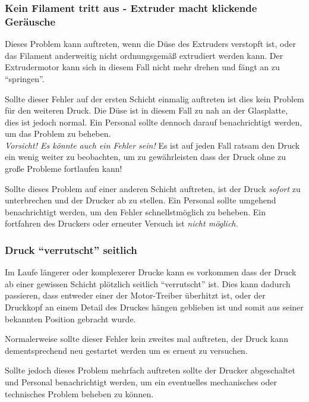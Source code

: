 \subsubsection[Kein Filamentaustritt]{Kein Filament tritt aus - Extruder macht klickende Geräusche}

Dieses Problem kann auftreten, wenn die Düse des Extruders verstopft ist, oder das Filament anderweitig nicht ordnungsgemäß extrudiert werden kann. Der Extrudermotor kann sich in diesem Fall nicht mehr drehen und fängt an zu "`springen"'.

Sollte dieser Fehler auf der ersten Schicht einmalig auftreten ist dies kein Problem für den weiteren Druck. Die Düse ist in diesem Fall zu nah an der Glasplatte, dies ist jedoch normal. 
Ein Personal sollte dennoch darauf benachrichtigt werden, um das Problem zu beheben. \\
\emph{Vorsicht! Es könnte auch ein Fehler sein!} Es ist auf jeden Fall ratsam den Druck ein wenig weiter zu beobachten, um zu gewährleisten dass der Druck ohne zu große Probleme fortlaufen kann!

Sollte dieses Problem auf einer anderen Schicht auftreten, ist der Druck \emph{sofort} zu unterbrechen und der Drucker ab zu stellen. Ein Personal sollte umgehend benachrichtigt werden, um den Fehler schnellstmöglich zu beheben. Ein fortfahren des Druckers oder erneuter Versuch ist \emph{nicht möglich.}

\subsubsection{Druck "`verrutscht"' seitlich}

Im Laufe längerer oder komplexerer Drucke kann es vorkommen dass der Druck ab einer gewissen Schicht plötzlich seitlich "`verrutscht"' ist. Dies kann dadurch passieren, dass entweder einer der Motor-Treiber überhitzt ist, oder der Druckkopf an einem Detail des Druckes hängen geblieben ist und somit aus seiner bekannten Position gebracht wurde.

Normalerweise sollte dieser Fehler kein zweites mal auftreten, der Druck kann dementsprechend neu gestartet werden um es erneut zu versuchen.

Sollte jedoch dieses Problem mehrfach auftreten sollte der Drucker abgeschaltet und Personal benachrichtigt werden, um ein eventuelles mechanisches oder technisches Problem beheben zu können.